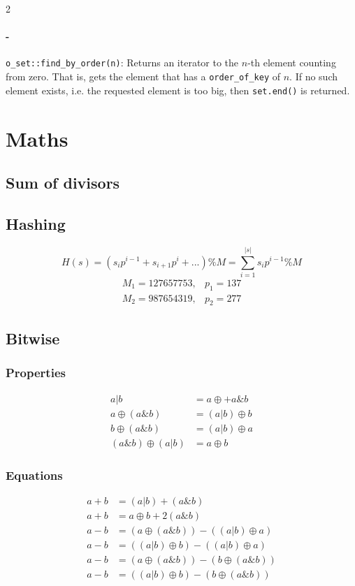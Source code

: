 \documentclass[8pt, letterpaper]{article}
\begin{document}
\begin{multicols}{2}
\paragraph{-} \verb|o_set::find_by_order(n)|: Returns an iterator to the $n$-th element counting from zero. That is, gets the element that has a \verb|order_of_key| of $n$. If no such element exists, i.e. the requested element is too big, then \verb|set.end()| is returned.











\section{Maths}
\subsection{Sum of divisors}


\subsection{Hashing}
$$
H(s) = (s_i p^{i-1} + s_{i+1}p^i+...)\% M=\sum_{i=1}^{|s|}s_i p^{i-1} \% M
$$
$$
\begin{array}{rl}
 M_1 = 127657753, & p_1 = 137 \\
 M_2 = 987654319, & p_2 = 277
\end{array}
$$


\subsection{Bitwise}
\subsubsection{Properties}
$$
\begin{array}{rl}
a | b &= a \oplus + a \& b \\
a \oplus (a \& b) &= (a|b)\oplus b \\
b \oplus (a \& b) &= (a | b)\oplus a \\
(a \& b) \oplus (a|b) &= a\oplus b
\end{array}
$$
\subsubsection{Equations}
$$
\begin{array}{rl}
 a+b &= (a|b)+(a \& b) \\
 a+b &= a\oplus b + 2(a \& b) \\
 a-b &= (a \oplus(a \& b))-((a|b)\oplus a) \\
 a-b &= ((a|b)\oplus b) - ((a|b)\oplus a) \\
 a-b &= (a \oplus (a\& b)) - (b \oplus (a \& b)) \\
 a-b &= ((a|b)\oplus b) - (b\oplus (a\&b))
\end{array}
$$


\end{multicols}
\end{document}
